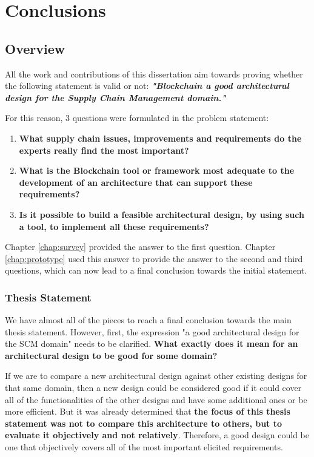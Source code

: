 \chapter{Conclusions}
\label{chap:conclusions}
\minitoc \mtcskip \noindent

\section{Overview}

All the work and contributions of this dissertation aim towards proving whether the following statement is valid or not: \textbf{\textit{"Blockchain a good architectural design for the Supply Chain Management domain."}}

 For this reason, 3 questions were formulated in the problem statement:
\begin{enumerate}
    \item \textbf{What supply chain issues, improvements and requirements do the experts really find the most important?}
    \item \textbf{What is the Blockchain tool or framework most adequate to the development of an architecture that can support these requirements?}
    \item \textbf{Is it possible to build a feasible architectural design, by using such a tool, to implement all these requirements?}
\end{enumerate}
    
Chapter \ref{chap:survey} provided the answer to the first question. Chapter \ref{chap:prototype} used this answer to provide the answer to the second and third questions, which can now lead to a final conclusion towards the initial statement.


\subsection*{Thesis Statement}
\par We have almost all of the pieces to reach a final conclusion towards the main thesis statement. However, first, the expression "a good architectural design for the SCM domain" needs to be clarified. \textbf{What exactly does it mean for an architectural design to be good for some domain?} 

If we are to compare a new architectural design against other existing designs for that same domain, then a new design could be considered good if it could cover all of the functionalities of the other designs and have some additional ones or be more efficient. But it was already determined that \textbf{the focus of this thesis statement was not to compare this architecture to others, but to evaluate it objectively and not relatively}. Therefore, a good design could be one that objectively covers all of the most important elicited requirements.


